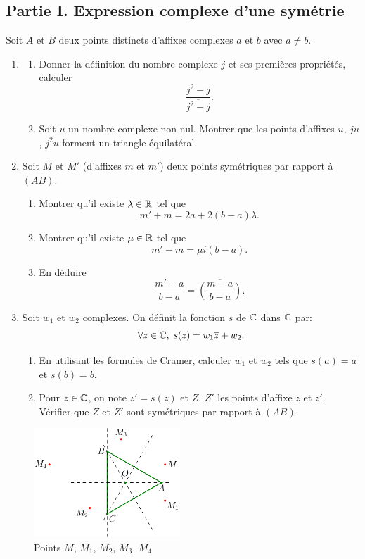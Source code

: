 \subsection*{Partie I. Expression complexe d'une symétrie} \noindent
Soit $A$ et $B$ deux points distincts d'affixes complexes $a$ et $b$ avec $a\neq b$.
\begin{enumerate}
  \item 
  \begin{enumerate}
    \item Donner la définition du nombre complexe $j$ et ses premières propriétés, calculer 
\[
  \frac{j^2 - j}{\overline{j^2 - j}}.
\]

    \item Soit $u$ un nombre complexe non nul. Montrer que les points d'affixes $u$, $ju$, $j^2u$ forment un triangle équilatéral.
  \end{enumerate}

  \item Soit $M$ et $M'$ (d'affixes $m$ et $m'$) deux points symétriques par rapport à $(AB)$.
  \begin{enumerate}
    \item Montrer qu'il existe $\lambda \in \mathbb{R}$ tel que 
    \[
      m' + m = 2a + 2(b-a)\lambda.
    \]
    \item Montrer qu'il existe $\mu \in \mathbb{R}$ tel que 
    \[
      m' - m = \mu i (b-a).
    \]
    \item En déduire
    \[
      \frac{m' - a}{b - a} = \overline{\left(\frac{m - a}{b-a}\right)}.
    \]
  \end{enumerate}

  \item Soit $w_1$ et $w_2$ complexes. On définit la fonction $s$ de $\mathbb{C}$ dans $\mathbb{C}$ par:
  \[
    \forall z \in \mathbb{C}, \; s(z) = w_1 \overline{z} + w_2.
  \]
  \begin{enumerate}
    \item En utilisant les formules de Cramer, calculer $w_1$ et $w_2$ tels que $s(a)=a$ et $s(b)=b$.
    \item Pour $z\in \mathbb{C}$, on note $z' = s(z)$ et $Z$, $Z'$ les points d'affixe $z$ et $z'$. Vérifier que $Z$ et $Z'$ sont symétriques par rapport à $(AB)$.
  \end{enumerate}
\end{enumerate}

\begin{figure}[!ht]
 \centering
 \includegraphics[width=5.5cm]{Ecomp2_1.pdf}
 \caption{Points $M$, $M_1$, $M_2$, $M_3$, $M_4$}
 \label{fig:Ecomp2_1}
\end{figure}

